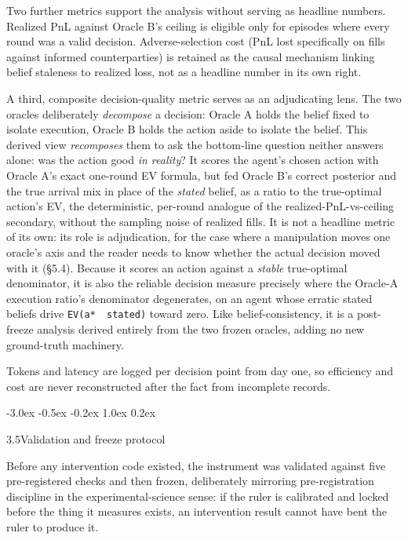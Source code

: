 \documentclass[
  11pt,
]{article}
\makeatletter
\renewcommand{\subsection}{%
  \@startsection{subsection}{2}{\z@}%
                {-3.0ex \@plus -0.5ex \@minus -0.2ex}%
                { 1.0ex \@plus  0.2ex}%
                {\normalsize\bf\raggedright}%
}
\makeatother
\begin{document}
Two further metrics support the analysis without serving as headline numbers. Realized PnL against Oracle B's ceiling is eligible only for episodes where every round was a valid decision. Adverse-selection cost (PnL lost specifically on fills against informed counterparties) is retained as the causal mechanism linking belief staleness to realized loss, not as a headline number in its own right.

A third, composite decision-quality metric serves as an adjudicating lens. The two oracles deliberately \emph{decompose} a decision: Oracle A holds the belief fixed to isolate execution, Oracle B holds the action aside to isolate the belief. This derived view \emph{recomposes} them to ask the bottom-line question neither answers alone: was the action good \emph{in reality}? It scores the agent's chosen action with Oracle A's exact one-round EV formula, but fed Oracle B's correct posterior and the true arrival mix in place of the \emph{stated} belief, as a ratio to the true-optimal action's EV, the deterministic, per-round analogue of the realized-PnL-vs-ceiling secondary, without the sampling noise of realized fills. It is not a headline metric of its own: its role is adjudication, for the case where a manipulation moves one oracle's axis and the reader needs to know whether the actual decision moved with it (§5.4). Because it scores an action against a \emph{stable} true-optimal denominator, it is also the reliable decision measure precisely where the Oracle-A execution ratio's denominator degenerates, on an agent whose erratic stated beliefs drive \texttt{EV(a*\ \textbar{}\ stated)} toward zero. Like belief-consistency, it is a post-freeze analysis derived entirely from the two frozen oracles, adding no new ground-truth machinery.

Tokens and latency are logged per decision point from day one, so efficiency and cost are never reconstructed after the fact from incomplete records.

\subsection{3.5\quad Validation and freeze protocol}\label{validation-and-freeze-protocol}

Before any intervention code existed, the instrument was validated against five pre-registered checks and then frozen, deliberately mirroring pre-registration discipline in the experimental-science sense: if the ruler is calibrated and locked before the thing it measures exists, an intervention result cannot have bent the ruler to produce it.
\end{document}
